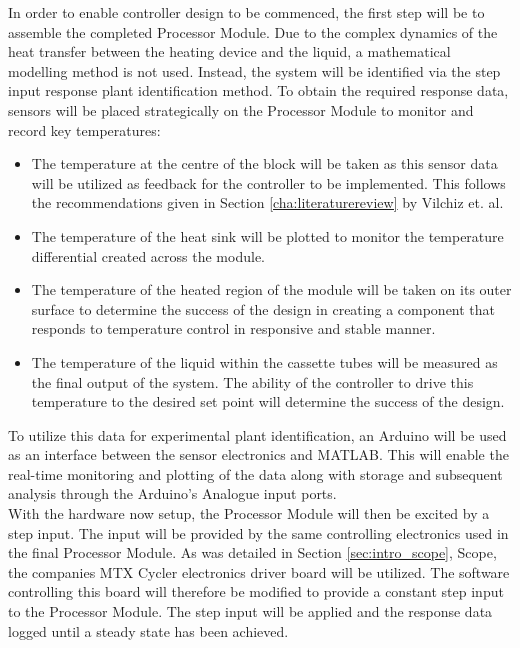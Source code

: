 In order to enable controller design to be commenced, the first step will be to assemble the completed Processor Module. Due to the complex dynamics of the heat transfer between the heating device and the liquid, a mathematical modelling method is not used. Instead, the system will be identified via the step input response plant identification method. To obtain the required response data, sensors will be placed strategically on the Processor Module to monitor and record key temperatures:
\begin{itemize}
	\item The temperature at the centre of the block will be taken as this sensor data will be utilized as feedback for the controller to be implemented. This follows the recommendations given in Section \ref{cha:literaturereview} by Vilchiz et. al.
	\item The temperature of the heat sink will be plotted to monitor the temperature differential created across the module.
	\item The temperature of the heated region of the module will be taken on its outer surface to determine the success of the design in creating a component that responds to temperature control in responsive and stable manner.
	\item The temperature of the liquid within the cassette tubes will be measured as the final output of the system. The ability of the controller to drive this temperature to the desired set point will determine the success of the design.
\end{itemize}

To utilize this data for experimental plant identification, an Arduino will be used as an interface between the sensor electronics and MATLAB. This will enable the real-time monitoring and plotting of the data along with storage and subsequent analysis through the Arduino's Analogue input ports.\\

With the hardware now setup, the Processor Module will then be excited by a step input. The input will be provided by the same controlling electronics used in the final Processor Module. As was detailed in Section \ref{sec:intro_scope}, Scope, the companies MTX Cycler electronics driver board will be utilized. The software controlling this board will therefore be modified to provide a constant step input to the Processor Module. The step input will be applied and the response data logged until a steady state has been achieved.\\

